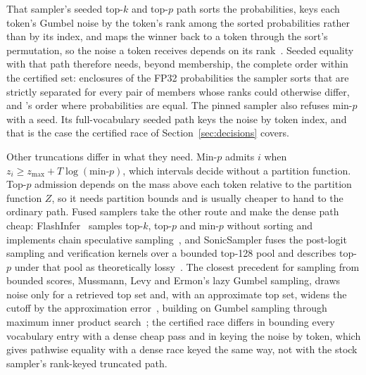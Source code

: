 That sampler's seeded top-$k$ and top-$p$ path sorts the probabilities, keys each token's Gumbel noise by the token's rank among the sorted probabilities rather than by its index, and maps the winner back to a token through the sort's permutation, so the noise a token receives depends on its rank~\cite{sglangsampler}. Seeded equality with that path therefore needs, beyond membership, the complete order within the certified set: enclosures of the FP32 probabilities the sampler sorts that are strictly separated for every pair of members whose ranks could otherwise differ, and 's order where probabilities are equal. The pinned sampler also refuses min-$p$ with a seed. Its full-vocabulary seeded path keys the noise by token index, and that is the case the certified race of Section~\ref{sec:decisions} covers.

Other truncations differ in what they need. Min-$p$ admits $i$ when $z_i\ge z_{\max}+T\log(\text{min-}p)$, which intervals decide without a partition function. Top-$p$ admission depends on the mass above each token relative to the partition function $Z$, so it needs partition bounds and is usually cheaper to hand to the ordinary path. Fused samplers take the other route and make the dense path cheap: FlashInfer~\cite{flashinfer} samples top-$k$, top-$p$ and min-$p$ without sorting and implements chain speculative sampling~\cite{flashinfersamplingblog}, and SonicSampler fuses the post-logit sampling and verification kernels over a bounded top-128 pool and describes top-$p$ under that pool as theoretically lossy~\cite{sonic}. The closest precedent for sampling from bounded scores, Mussmann, Levy and Ermon's lazy Gumbel sampling, draws noise only for a retrieved top set and, with an approximate top set, widens the cutoff by the approximation error~\cite{mussmann2017}, building on Gumbel sampling through maximum inner product search~\cite{mussmann2016}; the certified race differs in bounding every vocabulary entry with a dense cheap pass and in keying the noise by token, which gives pathwise equality with a dense race keyed the same way, not with the stock sampler's rank-keyed truncated path.

